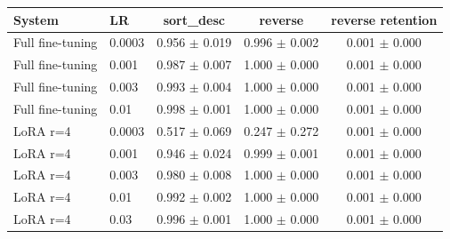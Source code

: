 \begin{tabular}{llccc}
\toprule
System & LR & sort\_desc & reverse & reverse retention \\
\midrule
Full fine-tuning & 0.0003 & 0.956 $\pm$ 0.019 & 0.996 $\pm$ 0.002 & 0.001 $\pm$ 0.000 \\
Full fine-tuning & 0.001 & 0.987 $\pm$ 0.007 & 1.000 $\pm$ 0.000 & 0.001 $\pm$ 0.000 \\
Full fine-tuning & 0.003 & 0.993 $\pm$ 0.004 & 1.000 $\pm$ 0.000 & 0.001 $\pm$ 0.000 \\
Full fine-tuning & 0.01 & 0.998 $\pm$ 0.001 & 1.000 $\pm$ 0.000 & 0.001 $\pm$ 0.000 \\
LoRA r=4 & 0.0003 & 0.517 $\pm$ 0.069 & 0.247 $\pm$ 0.272 & 0.001 $\pm$ 0.000 \\
LoRA r=4 & 0.001 & 0.946 $\pm$ 0.024 & 0.999 $\pm$ 0.001 & 0.001 $\pm$ 0.000 \\
LoRA r=4 & 0.003 & 0.980 $\pm$ 0.008 & 1.000 $\pm$ 0.000 & 0.001 $\pm$ 0.000 \\
LoRA r=4 & 0.01 & 0.992 $\pm$ 0.002 & 1.000 $\pm$ 0.000 & 0.001 $\pm$ 0.000 \\
LoRA r=4 & 0.03 & 0.996 $\pm$ 0.001 & 1.000 $\pm$ 0.000 & 0.001 $\pm$ 0.000 \\
\bottomrule
\end{tabular}
